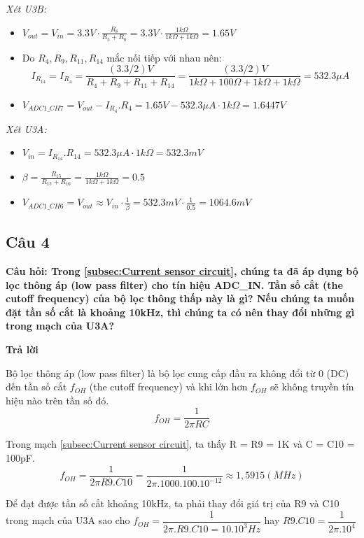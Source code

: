 \textit{Xét U3B:}
\begin{itemize}
    \item $V_{out} = V_{in} = 3.3V \cdot \frac{R_8}{R_5 + R_8} = 3.3V \cdot \frac{1k\Omega}{1k\Omega + 1k\Omega} = 1.65V$
    \item Do $R_4, R_9, R_{11}, R_{14}$ mắc nối tiếp với nhau nên: \[I_{R_{14}} = I_{R_4} = \frac{(3.3 / 2) V}{R_4 + R_9 + R_{11} + R_{14}} = \frac{(3.3 / 2) V}{1k\Omega + 100\Omega + 1k\Omega + 1k\Omega} = 532.3 \mu A \]
    \item $V_{ADC1\_CH7} = V_{out} - I_{R_4}.R_4 = 1.65V  - 532.3 \mu A \cdot 1k\Omega = 1.6447V$
\end{itemize}
\textit{Xét U3A:}
\begin{itemize}
    \item $V_{in} = I_{R_{14}}.R_{14} = 532.3 \mu A \cdot 1k\Omega = 532.3mV$
    \item $\beta = \frac{R_{15}}{R_{15} + R_{16}} = \frac{1k\Omega}{1k\Omega + 1k\Omega} = 0.5$
    \item $V_{ADC1\_CH6} = V_{out} \approx V_{in} \cdot \frac{1}{\beta} = 532.3mV \cdot \frac{1}{0.5} = 1064.6mV$
\end{itemize}
\pagebreak
\subsection{Câu 4}
\textbf{Câu hỏi: Trong \ref{subsec:Current sensor circuit}, chúng ta đã áp dụng bộ lọc thông áp (low pass filter) cho tín hiệu ADC\_IN. Tần số cắt (the cutoff frequency) của bộ lọc thông thấp này là gì? Nếu chúng ta muốn đặt tần số cắt là khoảng 10kHz, thì
chúng ta có nên thay đổi những gì trong mạch của U3A?}

\textbf{Trả lời}

Bộ lọc thông áp (low pass filter) là bộ lọc cung cấp đầu ra không đổi từ 0 (DC) đến tần số cắt $f_{OH}$ (the cutoff frequency) và khi lớn hơn $f_{OH}$ sẽ
không truyền tín hiệu nào trên tần số đó.
\[f_{OH} = \dfrac{1}{2\pi RC}\]

Trong mạch \ref{subsec:Current sensor circuit}, ta thấy R = R9 = 1K và C = C10 = 100pF.
\[f_{OH} = \dfrac{1}{2\pi R9.C10} = \dfrac{1}{2\pi .1000.100.10^{-12}} \approx 1,5915 (MHz)\]

Để đạt được tần số cắt khoảng 10kHz, ta phải thay đổi giá trị của R9 và C10 trong mạch của U3A sao cho $ f_{OH} = \dfrac{1}{2\pi.R9.C10 = 10.10^3 Hz}$ hay $ R9.C10 = \dfrac{1}{2\pi.10^4}$
\pagebreak
